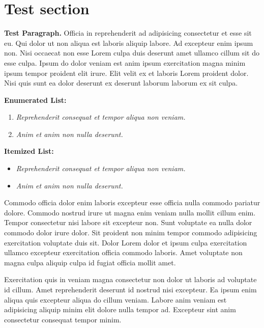\section{Test section}
\textbf{Test Paragraph.} Officia in reprehenderit ad adipisicing consectetur et esse sit eu. Qui dolor ut non aliqua est laboris aliquip labore. Ad excepteur enim ipsum non. Nisi occaecat non esse Lorem culpa duis deserunt amet ullamco cillum sit do esse culpa. Ipsum do dolor veniam est anim ipsum exercitation magna minim ipsum tempor proident elit irure. Elit velit ex et laboris Lorem proident dolor. Nisi quis sunt ea dolor deserunt ex deserunt laborum laborum ex sit culpa.

\vfill

\textbf{Enumerated List:}
\begin{enumerate}
  \item \textit{Reprehenderit consequat et tempor aliqua non veniam.}
  \item \textit{Anim et anim non nulla deserunt.}
\end{enumerate}

\vfill

\textbf{Itemized List:}
\begin{itemize}
  \item \textit{Reprehenderit consequat et tempor aliqua non veniam.}
  \item \textit{Anim et anim non nulla deserunt.}
\end{itemize}

\vfill

\begin{info}
Commodo officia dolor enim laboris excepteur esse officia nulla commodo pariatur dolore. Commodo nostrud irure ut magna enim veniam nulla mollit cillum enim. Tempor consectetur nisi labore sit excepteur non. Sunt voluptate ea nulla dolor commodo dolor irure dolor. Sit proident non minim tempor commodo adipisicing exercitation voluptate duis sit. Dolor Lorem dolor et ipsum culpa exercitation ullamco excepteur exercitation officia commodo laboris. Amet voluptate non magna culpa aliquip culpa id fugiat officia mollit amet.
\end{info}

\begin{warn}
Exercitation quis in veniam magna consectetur non dolor ut laboris ad voluptate id cillum. Amet reprehenderit deserunt id nostrud nisi excepteur. Ea ipsum enim aliqua quis excepteur aliqua do cillum veniam. Labore anim veniam est adipisicing aliquip minim elit dolore nulla tempor ad. Excepteur sint anim consectetur consequat tempor minim.
\end{warn}